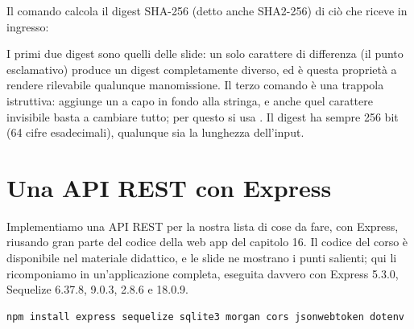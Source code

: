 Il comando  calcola il digest SHA-256 (detto anche SHA2-256)
di ciò che riceve in ingresso:


I primi due digest sono quelli delle slide: un solo carattere di differenza (il
punto esclamativo) produce un digest completamente diverso, ed è questa
proprietà a rendere rilevabile qualunque manomissione. Il terzo comando è una
trappola istruttiva:  aggiunge un a capo in fondo alla stringa, e
anche quel carattere invisibile basta a cambiare tutto; per questo si usa
. Il digest ha sempre 256 bit (64 cifre esadecimali), qualunque
sia la lunghezza dell'input.

\section{Una API REST con Express}

Implementiamo una API REST per la nostra lista di cose da fare, con Express,
riusando gran parte del codice della web app del capitolo 16. Il codice del
corso è disponibile nel materiale didattico, e le slide ne mostrano i punti
salienti; qui li ricomponiamo in un'applicazione completa, eseguita davvero con
Express 5.3.0, Sequelize 6.37.8,  9.0.3,  2.8.6 e
 18.0.9.

\begin{lstlisting}[style=shell]
npm install express sequelize sqlite3 morgan cors jsonwebtoken dotenv
\end{lstlisting}

